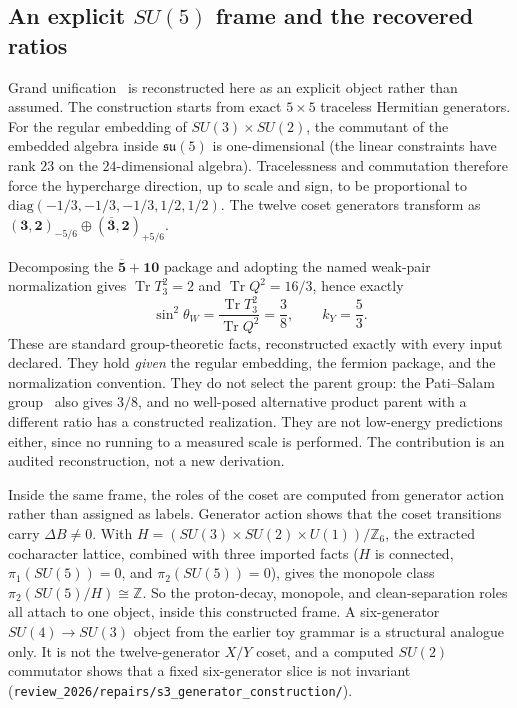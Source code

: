 \subsection{An explicit \texorpdfstring{\(SU(5)\)}{SU(5)} frame and the recovered ratios}\label{the-xy-coset-spine-and-the-recovered-unification-ratios}

Grand unification~\citep{GeorgiGlashow1974} is reconstructed here as an explicit object rather than assumed. The
construction starts from exact \(5\times5\) traceless Hermitian generators. For the regular embedding of
\(SU(3)\times SU(2)\), the commutant of the embedded algebra inside \(\mathfrak{su}(5)\) is one-dimensional (the
linear constraints have rank \(23\) on the \(24\)-dimensional algebra). Tracelessness and commutation therefore force
the hypercharge direction, up to scale and sign, to be proportional to \(\mathrm{diag}(-1/3,-1/3,-1/3,1/2,1/2)\). The
twelve coset generators transform as \((\mathbf3,\mathbf2)_{-5/6}\oplus(\overline{\mathbf3},\mathbf2)_{+5/6}\).

Decomposing the \(\overline{\mathbf5}+\mathbf{10}\) package and adopting the named weak-pair normalization gives
\(\operatorname{Tr}T_3^2=2\) and \(\operatorname{Tr}Q^2=16/3\), hence exactly
\[
\sin^2\theta_W=\frac{\operatorname{Tr}T_3^2}{\operatorname{Tr}Q^2}=\frac38,
\qquad k_Y=\frac53 .
\]
These are standard group-theoretic facts, reconstructed exactly with every input declared. They hold \emph{given} the
regular embedding, the fermion package, and the normalization convention. They do not select the parent group: the
Pati--Salam group~\citep{PatiSalam1974} also gives \(3/8\), and no well-posed alternative product parent with a
different ratio has a constructed realization. They are not low-energy predictions either, since no running to a
measured scale is performed. The contribution is an audited reconstruction, not a new derivation.

Inside the same frame, the roles of the coset are computed from generator action rather than assigned as labels.
Generator action shows that the coset transitions carry \(\Delta B\neq0\). With
\(H=(SU(3)\times SU(2)\times U(1))/\mathbb Z_6\), the extracted cocharacter lattice, combined with three imported
facts (\(H\) is connected, \(\pi_1(SU(5))=0\), and \(\pi_2(SU(5))=0\)), gives the monopole class
\(\pi_2(SU(5)/H)\cong\mathbb Z\). So the
proton-decay, monopole, and clean-separation roles all attach to one object, inside this constructed frame. A
six-generator \(SU(4)\to SU(3)\) object from the earlier toy grammar is a structural analogue only. It is not the
twelve-generator \(X/Y\) coset, and a computed \(SU(2)\) commutator shows that a fixed six-generator slice is not
invariant (\nolinkurl{review_2026/repairs/s3_generator_construction/}).

